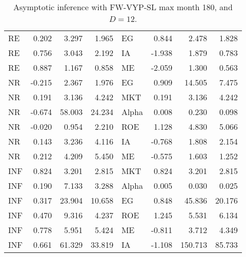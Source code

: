 \documentclass[12pt]{article}
\begin{document}
\begin{table}[ht]
\begin{tabular}{lrrrlrrr}
RE & 0.202 & 3.297 & 1.965 & EG & 0.844 & 2.478 & 1.828 \\ 
RE & 0.756 & 3.043 & 2.192 & IA & -1.938 & 1.879 & 0.783 \\ 
RE & 0.887 & 1.167 & 0.858 & ME & -2.059 & 1.300 & 0.563 \\ 
\hline
NR & -0.215 & 2.367 & 1.976 & EG & 0.909 & 14.505 & 7.475 \\ 
NR & 0.191 & 3.136 & 4.242 & MKT & 0.191 & 3.136 & 4.242 \\ 
NR & -0.674 & 58.003 & 24.234 & Alpha & 0.008 & 0.230 & 0.098 \\ 
NR & -0.020 & 0.954 & 2.210 & ROE & 1.128 & 4.830 & 5.066 \\ 
NR & 0.143 & 3.236 & 4.116 & IA & -0.768 & 1.808 & 2.154 \\ 
NR & 0.212 & 4.209 & 5.450 & ME & -0.575 & 1.603 & 1.252 \\ 
\hline
INF & 0.824 & 3.201 & 2.815 & MKT & 0.824 & 3.201 & 2.815 \\ 
INF & 0.190 & 7.133 & 3.288 & Alpha & 0.005 & 0.030 & 0.025 \\ 
INF & 0.317 & 23.904 & 10.658 & EG & 0.848 & 45.836 & 20.176 \\ 
INF & 0.470 & 9.316 & 4.237 & ROE & 1.245 & 5.531 & 6.134 \\ 
INF & 0.778 & 5.951 & 5.424 & ME & -0.811 & 3.712 & 4.349 \\ 
INF & 0.661 & 61.329 & 33.819 & IA & -1.108 & 150.713 & 85.733 \\ 
		\hline
		\hline
	\end{tabular}
	\caption{Asymptotic inference with FW-VYP-SL max month 180, and $D=12$.} 
	\label{tab:ai_180_FW_VYP_SL}
\end{table}
\end{document}
